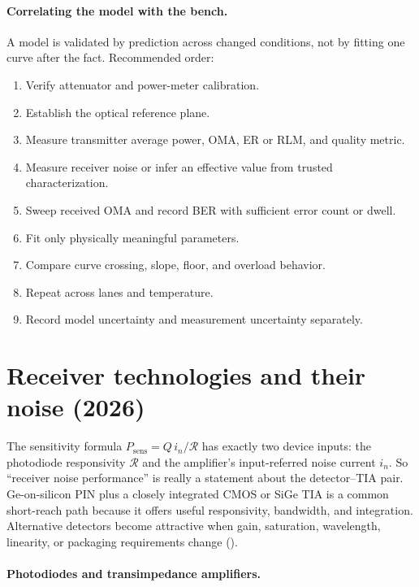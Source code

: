 \paragraph{Correlating the model with the bench.}
\label{sec:model-to-bench}
A model is validated by prediction across changed conditions, not by fitting one
curve after the fact. Recommended order:
\begin{enumerate}
\item Verify attenuator and power-meter calibration.
\item Establish the optical reference plane.
\item Measure transmitter average power, OMA, ER or RLM, and quality metric.
\item Measure receiver noise or infer an effective value from trusted
      characterization.
\item Sweep received OMA and record BER with sufficient error count or dwell.
\item Fit only physically meaningful parameters.
\item Compare curve crossing, slope, floor, and overload behavior.
\item Repeat across lanes and temperature.
\item Record model uncertainty and measurement uncertainty separately.
\end{enumerate}

\section{Receiver technologies and their noise (2026)}
\label{sec:rxtech}

The sensitivity formula $P_{\text{sens}}=Q\,i_n/\mathcal{R}$ has exactly two
device inputs: the photodiode responsivity $\mathcal{R}$ and the amplifier's
input-referred noise current $i_n$. So ``receiver noise performance'' is really a
statement about the detector--TIA pair. Ge-on-silicon PIN plus a closely
integrated CMOS or SiGe TIA is a common short-reach path because it offers useful
responsivity, bandwidth, and integration. Alternative detectors become attractive
when gain, saturation, wavelength, linearity, or packaging requirements change
().

\paragraph{Photodiodes and transimpedance amplifiers.}
\label{sec:pd-tia}

